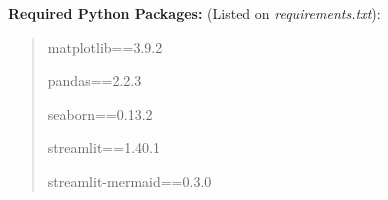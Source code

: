\textbf{Required Python Packages:} (Listed on \textit{requirements.txt}):
\begin{quote}

    matplotlib==3.9.2

    pandas==2.2.3

    seaborn==0.13.2

    streamlit==1.40.1
    
    streamlit-mermaid==0.3.0
    
\end{quote}


